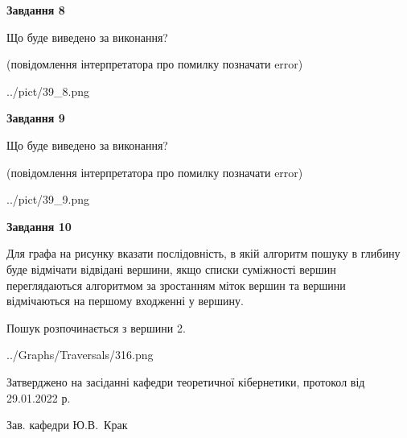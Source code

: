 \documentclass[12pt, ukrainian]{article}
\begin{document}
{\begin {large}
{\begin {center}\textbf{Завдання 8}\end {center}}\par
Що буде виведено за виконання?\par
 (повідомлення інтерпретатора про помилку позначати error)
\begin{center}
	{../pict/39_8.png}
\end{center}
\newpage

{\begin {center}\textbf{Завдання 9}\end {center}}\par
Що буде виведено за виконання?\par
 (повідомлення інтерпретатора про помилку позначати error)\par
\begin{center}
	{../pict/39_9.png}
\end{center}
\newpage

{\begin {center}\textbf{Завдання 10}\end {center}}\par
Для графа на рисунку вказати послідовність, в якій алгоритм пошуку в глибину буде відмічати відвідані вершини, якщо списки суміжності вершин переглядаються алгоритмом за зростанням міток вершин та вершини відмічаються на першому вход\-женні у вершину.\par
Пошук розпочинається з вершини 2.\par

\begin{center}
	{../Graphs/Traversals/316.png}
\end{center}\par
\newpage


\end {large}
}
{\smallskip \begin {small} Затверджено на засіданні кафедри теоретичної кібернетики, протокол  від   29.01.2022 р.\par\smallskip\smallskip
{\parbox {6.5 cm}{Зав. кафедри \dotfill Ю.В.~Крак}} \end{small}}
\end{document}
